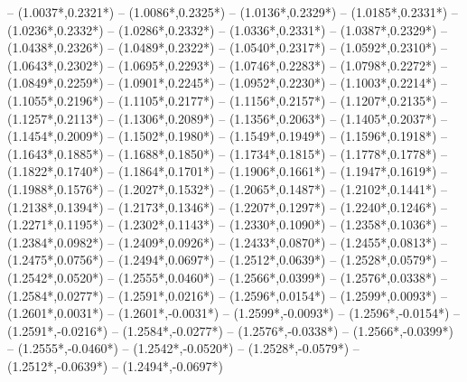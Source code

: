 {	-- ({1.0037*\dx},{0.2321*\dy})
	-- ({1.0086*\dx},{0.2325*\dy})
	-- ({1.0136*\dx},{0.2329*\dy})
	-- ({1.0185*\dx},{0.2331*\dy})
	-- ({1.0236*\dx},{0.2332*\dy})
	-- ({1.0286*\dx},{0.2332*\dy})
	-- ({1.0336*\dx},{0.2331*\dy})
	-- ({1.0387*\dx},{0.2329*\dy})
	-- ({1.0438*\dx},{0.2326*\dy})
	-- ({1.0489*\dx},{0.2322*\dy})
	-- ({1.0540*\dx},{0.2317*\dy})
	-- ({1.0592*\dx},{0.2310*\dy})
	-- ({1.0643*\dx},{0.2302*\dy})
	-- ({1.0695*\dx},{0.2293*\dy})
	-- ({1.0746*\dx},{0.2283*\dy})
	-- ({1.0798*\dx},{0.2272*\dy})
	-- ({1.0849*\dx},{0.2259*\dy})
	-- ({1.0901*\dx},{0.2245*\dy})
	-- ({1.0952*\dx},{0.2230*\dy})
	-- ({1.1003*\dx},{0.2214*\dy})
	-- ({1.1055*\dx},{0.2196*\dy})
	-- ({1.1105*\dx},{0.2177*\dy})
	-- ({1.1156*\dx},{0.2157*\dy})
	-- ({1.1207*\dx},{0.2135*\dy})
	-- ({1.1257*\dx},{0.2113*\dy})
	-- ({1.1306*\dx},{0.2089*\dy})
	-- ({1.1356*\dx},{0.2063*\dy})
	-- ({1.1405*\dx},{0.2037*\dy})
	-- ({1.1454*\dx},{0.2009*\dy})
	-- ({1.1502*\dx},{0.1980*\dy})
	-- ({1.1549*\dx},{0.1949*\dy})
	-- ({1.1596*\dx},{0.1918*\dy})
	-- ({1.1643*\dx},{0.1885*\dy})
	-- ({1.1688*\dx},{0.1850*\dy})
	-- ({1.1734*\dx},{0.1815*\dy})
	-- ({1.1778*\dx},{0.1778*\dy})
	-- ({1.1822*\dx},{0.1740*\dy})
	-- ({1.1864*\dx},{0.1701*\dy})
	-- ({1.1906*\dx},{0.1661*\dy})
	-- ({1.1947*\dx},{0.1619*\dy})
	-- ({1.1988*\dx},{0.1576*\dy})
	-- ({1.2027*\dx},{0.1532*\dy})
	-- ({1.2065*\dx},{0.1487*\dy})
	-- ({1.2102*\dx},{0.1441*\dy})
	-- ({1.2138*\dx},{0.1394*\dy})
	-- ({1.2173*\dx},{0.1346*\dy})
	-- ({1.2207*\dx},{0.1297*\dy})
	-- ({1.2240*\dx},{0.1246*\dy})
	-- ({1.2271*\dx},{0.1195*\dy})
	-- ({1.2302*\dx},{0.1143*\dy})
	-- ({1.2330*\dx},{0.1090*\dy})
	-- ({1.2358*\dx},{0.1036*\dy})
	-- ({1.2384*\dx},{0.0982*\dy})
	-- ({1.2409*\dx},{0.0926*\dy})
	-- ({1.2433*\dx},{0.0870*\dy})
	-- ({1.2455*\dx},{0.0813*\dy})
	-- ({1.2475*\dx},{0.0756*\dy})
	-- ({1.2494*\dx},{0.0697*\dy})
	-- ({1.2512*\dx},{0.0639*\dy})
	-- ({1.2528*\dx},{0.0579*\dy})
	-- ({1.2542*\dx},{0.0520*\dy})
	-- ({1.2555*\dx},{0.0460*\dy})
	-- ({1.2566*\dx},{0.0399*\dy})
	-- ({1.2576*\dx},{0.0338*\dy})
	-- ({1.2584*\dx},{0.0277*\dy})
	-- ({1.2591*\dx},{0.0216*\dy})
	-- ({1.2596*\dx},{0.0154*\dy})
	-- ({1.2599*\dx},{0.0093*\dy})
	-- ({1.2601*\dx},{0.0031*\dy})
	-- ({1.2601*\dx},{-0.0031*\dy})
	-- ({1.2599*\dx},{-0.0093*\dy})
	-- ({1.2596*\dx},{-0.0154*\dy})
	-- ({1.2591*\dx},{-0.0216*\dy})
	-- ({1.2584*\dx},{-0.0277*\dy})
	-- ({1.2576*\dx},{-0.0338*\dy})
	-- ({1.2566*\dx},{-0.0399*\dy})
	-- ({1.2555*\dx},{-0.0460*\dy})
	-- ({1.2542*\dx},{-0.0520*\dy})
	-- ({1.2528*\dx},{-0.0579*\dy})
	-- ({1.2512*\dx},{-0.0639*\dy})
	-- ({1.2494*\dx},{-0.0697*\dy})
}
